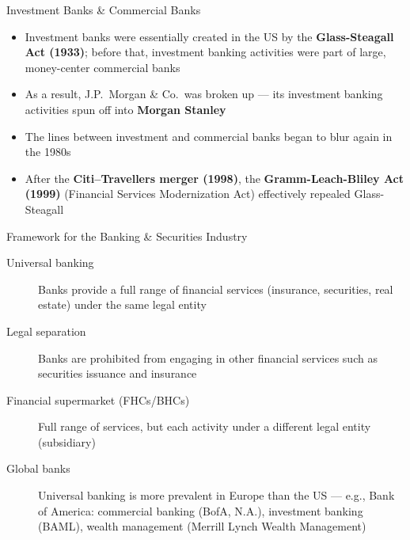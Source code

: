 \documentclass[aspectratio=169]{beamer}
\begin{document}
\begin{frame}{Investment Banks \& Commercial Banks}
\begin{itemize}
  \item Investment banks were essentially created in the US by the \textbf{Glass-Steagall Act (1933)}; before that, investment banking activities were part of large, money-center commercial banks
  \item As a result, J.P.\ Morgan \& Co.\ was broken up --- its investment banking activities spun off into \textbf{Morgan Stanley}
  \item The lines between investment and commercial banks began to blur again in the 1980s
  \item After the \textbf{Citi--Travellers merger (1998)}, the \textbf{Gramm-Leach-Bliley Act (1999)} (Financial Services Modernization Act) effectively repealed Glass-Steagall
\end{itemize}
\end{frame}

\begin{frame}{Framework for the Banking \& Securities Industry}
\begin{description}
  \item[Universal banking] Banks provide a full range of financial services (insurance, securities, real estate) under the same legal entity
  \item[Legal separation] Banks are prohibited from engaging in other financial services such as securities issuance and insurance
  \item[Financial supermarket (FHCs/BHCs)] Full range of services, but each activity under a different legal entity (subsidiary)
  \item[Global banks] Universal banking is more prevalent in Europe than the US --- e.g., Bank of America: commercial banking (BofA, N.A.), investment banking (BAML), wealth management (Merrill Lynch Wealth Management)
\end{description}
\end{frame}
\end{document}
